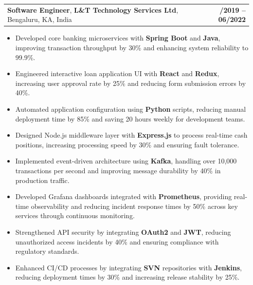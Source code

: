 \documentclass[letterpaper,11pt]{article}
\makeatletter
\newcommand{\resumeItem}[1]{
  \item\footnotesize{
    {#1 \vspace{-2pt}}
  }
}
\newcommand{\resumeSubheading}[4]{
  \vspace{-2pt}\item
    \begin{tabular*}{1.0\textwidth}[t]{l@{\extracolsep{\fill}}r}
      \textbf{\fontsize{10pt}{14pt}\selectfont #3}, \textbf{\fontsize{10pt}{14pt}\selectfont #1}, \fontsize{10pt}{14pt}\selectfont #4 & \textbf{\fontsize{10pt}{14pt}\selectfont #2} \\
    \end{tabular*}\vspace{-7pt}
}
\newcommand{\resumeItemListStart}{\begin{itemize}[leftmargin=*]}
\newcommand{\resumeItemListEnd}{\end{itemize}\vspace{-5pt}}
\makeatother
\begin{document}
    \resumeSubheading
        {L\&T Technology Services Ltd}{08/2019 -- 06/2022}
        {Software Engineer}{Bengaluru, KA, India}
      \resumeItemListStart
        \resumeItem{Developed core banking microservices with \textbf{Spring Boot} and \textbf{Java}, improving transaction throughput by 30\% and enhancing system reliability to 99.9\%.}
        \resumeItem{Engineered interactive loan application UI with \textbf{React} and \textbf{Redux}, increasing user approval rate by 25\% and reducing form submission errors by 40\%.}
        \resumeItem{Automated application configuration using \textbf{Python} scripts, reducing manual deployment time by 85\% and saving 20 hours weekly for development teams.}
        \resumeItem{Designed Node.js middleware layer with \textbf{Express.js} to process real-time cash positions, increasing processing speed by 30\% and ensuring fault tolerance.}
        \resumeItem{Implemented event-driven architecture using \textbf{Kafka}, handling over 10,000 transactions per second and improving message durability by 40\% in production traffic.}
        \resumeItem{Developed Grafana dashboards integrated with \textbf{Prometheus}, providing real-time observability and reducing incident response times by 50\% across key services through continuous monitoring.}
        \resumeItem{Strengthened API security by integrating \textbf{OAuth2} and \textbf{JWT}, reducing unauthorized access incidents by 40\% and ensuring compliance with regulatory standards.}
        \resumeItem{Enhanced CI/CD processes by integrating \textbf{SVN} repositories with \textbf{Jenkins}, reducing deployment times by 30\% and increasing release stability by 25\%.}
      \resumeItemListEnd
\end{document}
